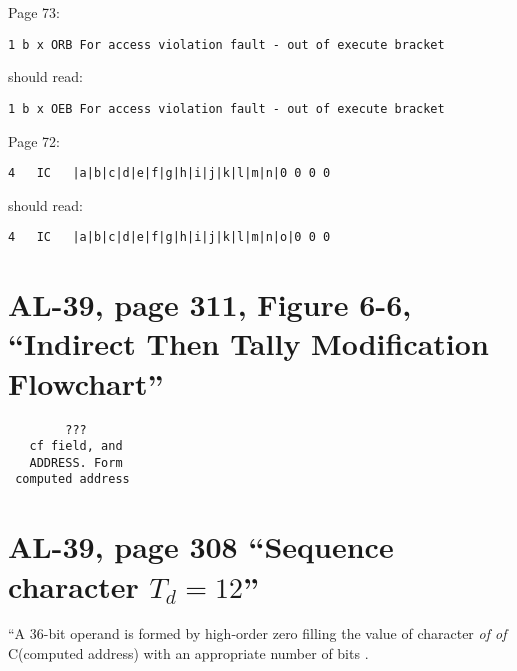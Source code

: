\documentclass[notitlepage]{report}
\begin{document}
Page 73:

\begin{verbatim}
1 b x ORB For access violation fault - out of execute bracket
\end{verbatim}

should read:

\begin{verbatim}
1 b x OEB For access violation fault - out of execute bracket
\end{verbatim}

Page 72:

\begin{verbatim}
4   IC   |a|b|c|d|e|f|g|h|i|j|k|l|m|n|0 0 0 0
\end{verbatim}

should read:

\begin{verbatim}
4   IC   |a|b|c|d|e|f|g|h|i|j|k|l|m|n|o|0 0 0
\end{verbatim}

\section{AL-39, page 311, Figure 6-6, ``Indirect Then Tally Modification Flowchart''}

\begin{verbatim}
        ???
   cf field, and
   ADDRESS. Form
 computed address
\end{verbatim}

\section{AL-39, page 308 ``Sequence character $T_d = 12$''}

``A 36-bit operand is formed by high-order zero filling the value of 
character \emph{of of} C(computed address) with an appropriate number of bits .
\end{document}

